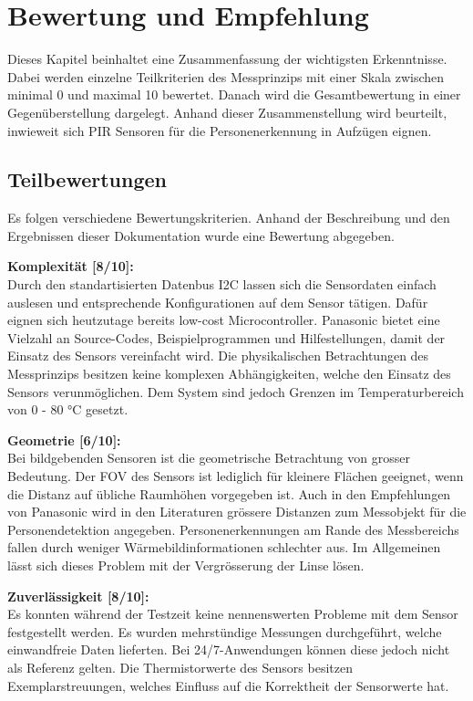 \chapter{Bewertung und Empfehlung}
\label{Empfehlung_Vorgehen}

Dieses Kapitel beinhaltet eine Zusammenfassung der wichtigsten Erkenntnisse. Dabei werden einzelne Teilkriterien des Messprinzips mit einer Skala zwischen minimal 0 und maximal 10  bewertet. Danach wird die Gesamtbewertung in einer Gegenüberstellung dargelegt. Anhand dieser Zusammenstellung wird beurteilt, inwieweit sich PIR Sensoren für die Personenerkennung in Aufzügen eignen. 

\section{Teilbewertungen}
\label{sec:Teilbewertung}

Es folgen verschiedene Bewertungskriterien. Anhand der Beschreibung und den Ergebnissen dieser Dokumentation wurde eine Bewertung abgegeben.

\textbf{Komplexität [8/10]:} \\
Durch den standartisierten Datenbus \ac{I2C} lassen sich die Sensordaten einfach auslesen und entsprechende Konfigurationen auf dem Sensor tätigen. Dafür eignen sich heutzutage bereits low-cost Microcontroller. Panasonic bietet eine Vielzahl an Source-Codes, Beispielprogrammen und Hilfestellungen, damit der Einsatz des Sensors vereinfacht wird. Die physikalischen Betrachtungen des Messprinzips besitzen keine komplexen Abhängigkeiten, welche den Einsatz des Sensors verunmöglichen. Dem System sind jedoch Grenzen im Temperaturbereich von 0 - 80 °C gesetzt.

\textbf{Geometrie [6/10]:} \\
Bei bildgebenden Sensoren ist die geometrische Betrachtung von grosser Bedeutung. Der \ac{FOV} des Sensors ist lediglich für kleinere Flächen geeignet, wenn die Distanz auf übliche Raumhöhen vorgegeben ist. Auch in den Empfehlungen von Panasonic wird in den Literaturen grössere Distanzen zum Messobjekt für die Personendetektion angegeben. Personenerkennungen am Rande des Messbereichs fallen durch weniger Wärmebildinformationen schlechter aus. Im Allgemeinen lässt sich dieses Problem mit der Vergrösserung der Linse lösen.

\textbf{Zuverlässigkeit [8/10]:} \\
Es konnten während der Testzeit keine nennenswerten Probleme mit dem Sensor festgestellt werden. Es wurden mehrstündige Messungen durchgeführt, welche einwandfreie Daten lieferten. Bei 24/7-Anwendungen können diese jedoch nicht als Referenz gelten. Die Thermistorwerte des Sensors besitzen Exemplarstreuungen, welches Einfluss auf die Korrektheit der Sensorwerte hat.
  
